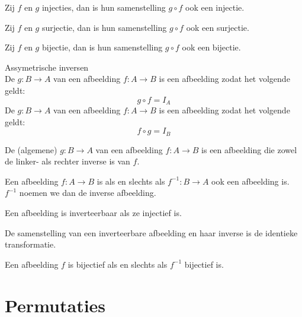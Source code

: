 \documentclass[main.tex]{subfiles}
\begin{document}
\begin{st}
  Zij $f$ en $g$ injecties, dan is hun samenstelling $g \circ f$ ook een injectie.
\end{st}

\begin{st}
  Zij $f$ en $g$ surjectie, dan is hun samenstelling $g \circ f$ ook een surjectie.
\end{st}

\begin{st}
  Zij $f$ en $g$ bijectie, dan is hun samenstelling $g \circ f$ ook een bijectie.
\end{st}

\begin{de}
  Assymetrische inversen\\
  De  $g:B \rightarrow A$ van een afbeelding $f:A \rightarrow B$ is een afbeelding zodat het volgende geldt:
  \[ g \circ f = I_{A} \]
  De  $g:B \rightarrow A$ van een afbeelding $f:A \rightarrow B$ is een afbeelding zodat het volgende geldt:
  \[ f \circ g = I_{B}\]
\end{de}

\begin{de}
  De (algemene)  $g:B \rightarrow A$ van een afbeelding $f:A \rightarrow B$ is een afbeelding die zowel de linker- als rechter inverse is van $f$.
\end{de}

\begin{de}
  Een afbeelding $f: A \rightarrow B$ is  als en slechts als $f^{-1}: B \rightarrow A$ ook een afbeelding is. $f^{-1}$ noemen we dan de inverse afbeelding.
\end{de}

\begin{st}
  \label{st:afb-injectief-dan-inverteerbaar}
  Een afbeelding is inverteerbaar als ze injectief is.
\end{st}

\begin{st}
  \label{st:afb+inverse=identieke}
  De samenstelling van een inverteerbare afbeelding en haar inverse is de identieke transformatie.
\end{st}

\begin{st}
  \label{st:f-bijec-asa-f-1-bijec}
  Een afbeelding $f$ is bijectief als en slechts als $f^{-1}$ bijectief is.
\end{st}

\section{Permutaties}
\label{sec:permutaties}
\end{document}
